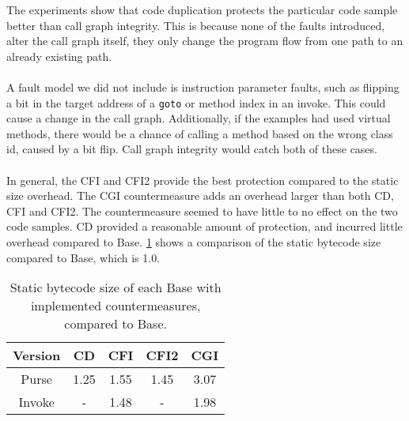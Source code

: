 The experiments show that code duplication protects the particular code sample better than call graph integrity. This is because none of the faults introduced, alter the call graph itself, they only change the program flow from one path to an already existing path.\\\\
A fault model we did not include is instruction parameter faults, such as flipping a bit in the target address of a \texttt{goto} or method index in an invoke. This could cause a change in the call graph. Additionally, if the examples had used virtual methods, there would be a chance of calling a method based on the wrong class id, caused by a bit flip. Call graph integrity would catch both of these cases.\\\\
In general, the CFI and CFI2 provide the best protection compared to the static size overhead. The CGI countermeasure adds an overhead larger than both CD, CFI and CFI2. The countermeasure seemed to have little to no effect on the two code samples. CD provided a reasonable amount of protection, and incurred little overhead compared to Base. \cref{tab:staticSize} shows a comparison of the static bytecode size compared to Base, which is 1.0.

\begin{table}[H]
\centering
\begin{tabular}{|c|c|c|c|c|}
\hline Version & CD & CFI & CFI2 & CGI \\ 
\hline Purse & 1.25 & 1.55 & 1.45 & 3.07 \\ 
\hline Invoke & - & 1.48 & - & 1.98 \\ 
\hline 
\end{tabular} 
    \caption{Static bytecode size of each Base with implemented countermeasures, compared to Base.}
\label{tab:staticSize}
\end{table}